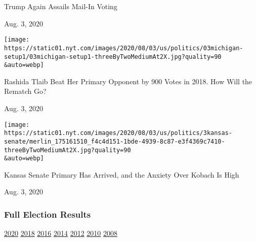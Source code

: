 Trump Again Assails Mail-In Voting

Aug. 3, 2020

\href{https://www.nytimes.com/2020/08/03/us/politics/michigan-primary-rashida-tlaib-brenda-jones.html?action=click\&module=ELEX_results\&pgtype=Interactive\&region=RelatedCoverage}{}

\texttt{[image: https://static01.nyt.com/images/2020/08/03/us/politics/03michigan-setup1/03michigan-setup1-threeByTwoMediumAt2X.jpg?quality=90\\\&auto=webp]}

Rashida Tlaib Beat Her Primary Opponent by 900 Votes in 2018. How Will
the Rematch Go?

Aug. 3, 2020

\href{https://www.nytimes.com/2020/08/03/us/politics/kris-kobach-kansas-senate-primary.html?action=click\&module=ELEX_results\&pgtype=Interactive\&region=RelatedCoverage}{}

\texttt{[image: https://static01.nyt.com/images/2020/08/03/us/politics/3kansas-senate/merlin\_175161510\_f4c4d151-1bde-4939-8c87-e3f4369c7410-threeByTwoMediumAt2X.jpg?quality=90\\\&auto=webp]}

Kansas Senate Primary Has Arrived, and the Anxiety Over Kobach Is High

Aug. 3, 2020

\hypertarget{full-election-results}{%
\subsubsection{Full Election Results}\label{full-election-results}}

\href{https://www.nytimes.com/interactive/2020/us/elections/delegate-count-primary-results.html?action=click\&module=ELEX_results\&pgtype=Interactive\&region=PastResultsFooter}{2020}
\href{https://www.nytimes.com/interactive/2018/us/elections/calendar-primary-results.html?action=click\&module=ELEX_results\&pgtype=Interactive\&region=PastResultsFooter}{2018}
\href{https://www.nytimes.com/elections/2016/results/president?action=click\&module=ELEX_results\&pgtype=Interactive\&region=PastResultsFooter}{2016}
\href{https://www.nytimes.com/elections/2014/results/senate?action=click\&module=ELEX_results\&pgtype=Interactive\&region=PastResultsFooter}{2014}
\href{https://www.nytimes.com/elections/2012/results/president.html?action=click\&module=ELEX_results\&pgtype=Interactive\&region=PastResultsFooter}{2012}
\href{https://www.nytimes.com/elections/2010/results/senate.html?action=click\&module=ELEX_results\&pgtype=Interactive\&region=PastResultsFooter}{2010}
\href{https://www.nytimes.com/elections/2008/results/president/map.html?action=click\&module=ELEX_results\&pgtype=Interactive\&region=PastResultsFooter}{2008}


